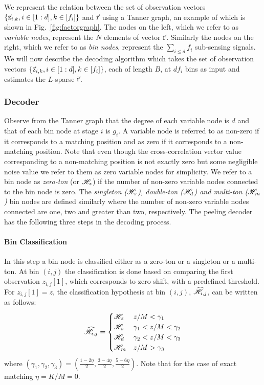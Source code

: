We represent the relation between the set of observation vectors $\{\vec{\mathrm{z}}_{i,k},i\in[1:d],k\in[f_i]\}$ and $\vec{\mathrm{r}}$ using a Tanner graph, an example of which is shown in Fig.~\ref{fig:factorgraph}. The nodes on the left, which we refer to as {\it variable nodes}, represent the $N$ elements of vector $\vec{\mathrm{r}}$. Similarly the nodes on the right, which we refer to as {\it bin nodes}, represent the $\sum_{i\leq d} f_i$ sub-sensing signals. We will now describe the decoding algorithm which takes the set of observation vectors $\{\vec{\mathrm{z}}_{i,k},i\in[1:d],k\in[f_i]\}$, each of length $B$, at $df_i$ bins as input and estimates the $L$-sparse $\vec{\mathrm{r}}$.	

\subsubsection{Decoder}			
	Observe from the Tanner graph that the degree of each variable node is $d$ and that of each bin node at stage $i$ is $g_i$. A variable node is referred to as non-zero if it corresponds to a matching position and as zero if it corresponds to a non-matching position. Note that even though the cross-correlation vector value corresponding to a non-matching position is not exactly zero but some negligible noise value we refer to them as zero variable nodes for simplicity. We refer to a bin node as {\it zero-ton} (or $\mathscr{H}_z$) if the number of non-zero variable nodes connected to the bin node is zero. The {\it singleton ($\mathscr{H}_s$), double-ton ($\mathscr{H}_d$) and multi-ton ($\mathscr{H}_m$)} bin nodes are defined similarly where the number of non-zero variable nodes connected are one, two and greater than two, respectively. The peeling decoder has the following three steps in the decoding process.

\paragraph*{Bin Classification} In this step a bin node is classified either as a zero-ton or a singleton or a multi-ton. At bin $(i,j)$ the classification is done based on  comparing the first observation $z_{i,j}[1]$, which corresponds to zero shift, with a predefined threshold. For $z_{i,j}[1]=z$, the classification hypothesis at bin $(i,j)$, $\widehat{\mathscr{H}}_{i,j}$, can be written as follows:
\begin{align}
\label{Eqn:BinClassifApprox}
\widehat{\mathscr{H}}_{i,j}=
\begin{cases}
\mathscr{H}_z &  	 z/M < \gamma_1\\
\mathscr{H}_s &	  \gamma_1 < z/M < \gamma_2  \\
\mathscr{H}_d  &    \gamma_2  < z/M <  \gamma_3\\
\mathscr{H}_m &      z/M > \gamma_3\\
\end{cases}
\end{align}
where $(\gamma_1,\gamma_2,\gamma_3)=(\frac{1-2\eta}{2},\frac{3-4\eta}{2},\frac{5-6\eta}{2})$. Note that for the case of exact matching $\eta=K/M=0$.
